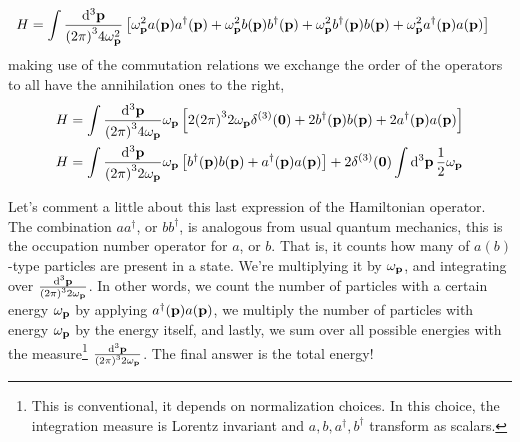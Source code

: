 \begin{align}
    H&=\int\frac{\dd[3]{\vb p}}{\qty(2\pi)^34\omega_{\vb p}^2}\left[\omega_{\vb p}^2a\qty(\vb p)a^\dagger\qty(\vb p)+ \omega_{\vb p}^2 b\qty(\vb p)b^\dagger\qty(\vb p)+\omega_{\vb p}^2b^\dagger\qty(\vb p)b\qty(\vb p)+\omega_{\vb p}^2 a^\dagger\qty(\vb p)a\qty(\vb p)\right]
\end{align}
making use of the commutation relations we exchange the order of the operators to all have the annihilation ones to the right,
\begin{align}
    H&=\int\frac{\dd[3]{\vb p}}{\qty(2\pi)^34\omega_{\vb p}}\omega_{\vb p}\left[2\qty(2\pi)^32\omega_{\vb p}\delta^{\qty(3)}\qty(\vb 0)+2b^\dagger\qty(\vb p)b\qty(\vb p)+ 2a^\dagger\qty(\vb p)a\qty(\vb p)\right]\\
    H&=\int\frac{\dd[3]{\vb p}}{\qty(2\pi)^32\omega_{\vb p}}\omega_{\vb p}\left[b^\dagger\qty(\vb p)b\qty(\vb p)+ a^\dagger\qty(\vb p)a\qty(\vb p)\right]+2\delta^{\qty(3)}\qty(\vb 0)\int\dd[3]{\vb p}\frac12\omega_{\vb p}
\end{align}

Let's comment a little about this last expression of the Hamiltonian operator. The combination $aa^\dagger$, or $bb^\dagger$, is analogous from usual quantum mechanics, this is the occupation number operator for $a$, or $b$. 
That is, it counts how many of $a(b)$-type particles are present in a state. We're multiplying it by $\omega_{\vb p}$, and integrating over $\frac{\dd[3]{\vb p}}{\qty(2\pi)^32\omega_{\vb p}}$. In other words, 
we count the number of particles with a certain energy $\omega_{\vb p} $ by applying $a^\dagger(\vb p)a\qty(\vb p)$, we multiply the number of particles with energy $\omega_{\vb p}$ by the energy itself, and lastly, 
we sum over all possible energies with the measure\footnote{This is conventional, it depends on normalization choices. In this choice, the integration measure is Lorentz invariant and $a,b,a^\dagger,b^\dagger$ transform 
as scalars.} $\frac{\dd[3]{\vb p}}{\qty(2\pi)^32\omega_{\vb p}}$. The final answer is the total energy!

